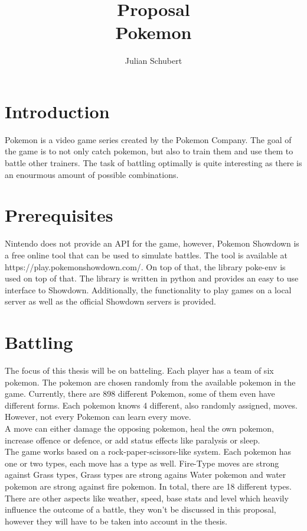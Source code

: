 \documentclass{article}
\title{Proposal \\ Pokemon}
\author{Julian Schubert}
\begin{document}
\maketitle

\section{Introduction}
Pokemon is a video game series created by the Pokemon Company.
The goal of the game is to not only catch pokemon, but also to train them and use
them to battle other trainers. The task of battling optimally is quite interesting
as there is an enourmous amount of possible combinations. 

\section{Prerequisites}
Nintendo does not provide an API for the game, however, Pokemon Showdown is a
free online tool that can be used to simulate battles. The tool is available at
https://play.pokemonshowdown.com/. On top of that, the library poke-env is used
on top of that. The library is written in python and provides an easy to use
interface to Showdown. Additionally, the functionality to play games on a 
local server as well as the official Showdown servers is provided.

\section{Battling}
The focus of this thesis will be on batteling. Each player has a team of six 
pokemon. The pokemon are chosen randomly from the available
pokemon in the game. Currently, there are 898 different Pokemon, some of them 
even have different forms. Each pokemon knows 4 different, also randomly assigned,
moves. However, not every Pokemon can learn every move. \\
A move can either damage the opposing pokemon, heal the own pokemon, increase offence
or defence, or add status effects like paralysis or sleep. \\
The game works based on a rock-paper-scissors-like system. Each pokemon has one
or two types, each move has a type as well. Fire-Type moves are strong against
Grass types, Grass types are strong agains Water pokemon and water pokemon
are strong against fire pokemon. In total, there are 18 different types. \\
There are other aspects like weather, speed, base stats and level which
heavily influence the outcome of a battle, they won't be discussed in 
this proposal, however they will have to be taken into account in the thesis.
\end{document}
